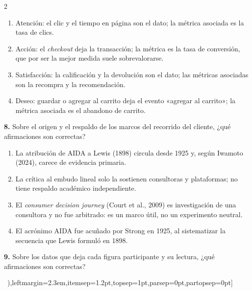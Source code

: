 \documentclass[10pt,letterpaper]{article}
\newcommand{\cas}{\framebox[1.0em]{\rule{0pt}{1.05ex}}}
\begin{document}
\begin{multicols}{2}
\begin{minipage}[t]{\columnwidth}
\vspace{1pt}\begin{enumerate}[label=\cas\ \alph*),leftmargin=2.3em,itemsep=1.2pt,topsep=1pt,parsep=0pt,partopsep=0pt]
\item Atención: el clic y el tiempo en página son el dato; la métrica asociada es la tasa de clics.
\item Acción: el \textit{checkout} deja la transacción; la métrica es la tasa de conversión, que por ser la mejor medida suele sobrevalorarse.
\item Satisfacción: la calificación y la devolución son el dato; las métricas asociadas son la recompra y la recomendación.
\item Deseo: guardar o agregar al carrito deja el evento «agregar al carrito»; la métrica asociada es el abandono de carrito.
\end{enumerate}\end{minipage}\par\vspace{3pt}
\begin{minipage}[t]{\columnwidth}\noindent\textbf{8.} Sobre el origen y el respaldo de los marcos del recorrido del cliente, ¿qué afirmaciones son correctas?
\vspace{1pt}\begin{enumerate}[label=\cas\ \alph*),leftmargin=2.3em,itemsep=1.2pt,topsep=1pt,parsep=0pt,partopsep=0pt]
\item La atribución de AIDA a Lewis (1898) circula desde 1925 y, según Iwamoto (2024), carece de evidencia primaria.
\item La crítica al embudo lineal solo la sostienen consultoras y plataformas; no tiene respaldo académico independiente.
\item El \textit{consumer decision journey} (Court et al., 2009) es investigación de una consultora y no fue arbitrado: es un marco útil, no un experimento neutral.
\item El acrónimo AIDA fue acuñado por Strong en 1925, al sistematizar la secuencia que Lewis formuló en 1898.
\end{enumerate}\end{minipage}\par\vspace{3pt}
\begin{minipage}[t]{\columnwidth}\noindent\textbf{9.} Sobre los datos que deja cada figura participante y su lectura, ¿qué afirmaciones son correctas?
\vspace{1pt}\begin{enumerate}[label=\cas\ \alph*),leftmargin=2.3em,itemsep=1.2pt,topsep=1pt,parsep=0pt,partopsep=0pt]

\end{enumerate}
\end{minipage}
\end{multicols}
\end{document}

